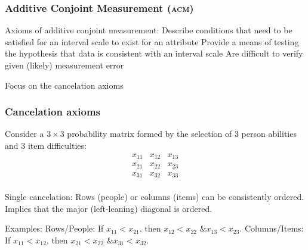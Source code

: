 \documentclass[10pt,serif,professionalfont]{beamer}
\begin{document}
\begin{frame}
    \frametitle{Additive Conjoint Measurement (\textsc{acm})}

    \begin{outline}
        \1 Axioms of additive conjoint measurement: 
            \2 Describe conditions that need to be satisfied for an interval scale to exist for an attribute
            \2 Provide a means of testing the hypothesis that data is consistent with an interval scale  
            \2 Are difficult to verify given (likely) measurement error  
            
        \vspace{0.25cm}
        
        \1 Focus on the cancelation axioms
    \end{outline}

\end{frame}

\begin{frame} 
    \frametitle{Cancelation axioms}
    
    Consider a $3 \times 3$ probability matrix formed by the selection of 3 person abilities and 3 item difficulties:
    \[
    \begin{array}{ccc}
      x_{11} & x_{12} & x_{13}  \\
      x_{21} & x_{22} & x_{23} \\
      x_{31} & x_{32} & x_{33} \\
    \end{array}
    \]
    
    \begin{outline}
        \1 Single cancelation: Rows (people) or columns (items) can be consistently ordered.  
            \2 Implies that the major (left-leaning) diagonal is ordered.  
    
        \vspace{0.1cm}
    
        \1 Examples: 
            \2 Rows/People: If $x_{11}<x_{21} \text{, then } x_{12}<x_{22} \text{ \& } x_{13}<x_{23}$.
            \2 Columns/Items: If $x_{11}<x_{12} \text{, then } x_{21}<x_{22} \text{ \& } x_{31}<x_{32}$.
    \end{outline}

\end{frame}
\end{document}
